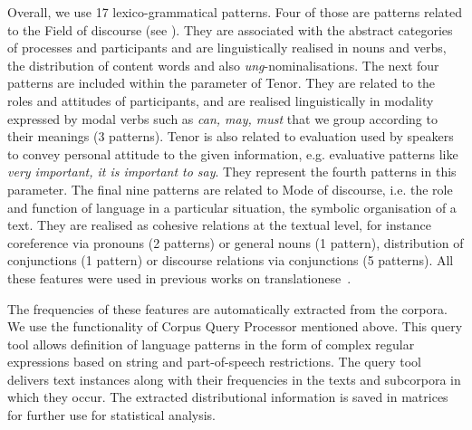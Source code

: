 \documentclass[output=paper,colorlinks,citecolor=brown]{langscibook}
\begin{document}
Overall, we use 17 lexico-grammatical patterns. Four of those are patterns related to the Field of discourse (see ). They are associated with the abstract categories of processes and participants and are linguistically realised in nouns and verbs, the distribution of content words and also \textit{ung}-nominalisations. The next four patterns are included within the parameter of Tenor. They are related to the roles and attitudes of participants, and are realised linguistically in modality expressed by modal verbs such as \textit{can, may, must} that we group according to their meanings (3 patterns). Tenor is also related to evaluation used by speakers to convey personal attitude to the given information, e.g. evaluative patterns like \textit{very important, it is important to say}. They represent the fourth patterns in this parameter. The final nine patterns are related to Mode of discourse, i.e. the %
role and function of language in a particular situation, %
the symbolic organisation of a text. 
They are realised as cohesive relations at the textual level, for instance coreference via pronouns (2 patterns) or general nouns (1 pattern), distribution of conjunctions (1 pattern) or discourse relations via conjunctions (5 patterns). All these features were used in previous works on translationese~\citep[see e.g.][]{Lapshinova2019TT3,Lapshinova2017Sle}.

The frequencies of these features are automatically extracted from the corpora. We use the functionality of Corpus Query Processor mentioned above.  %
This query tool allows definition of language patterns in the form of complex regular expressions based on string and part-of-speech restrictions. %
The query tool delivers text instances along with their frequencies in the texts and subcorpora in which they occur. %
The extracted distributional information is saved in matrices for further use for statistical analysis.
\end{document}
